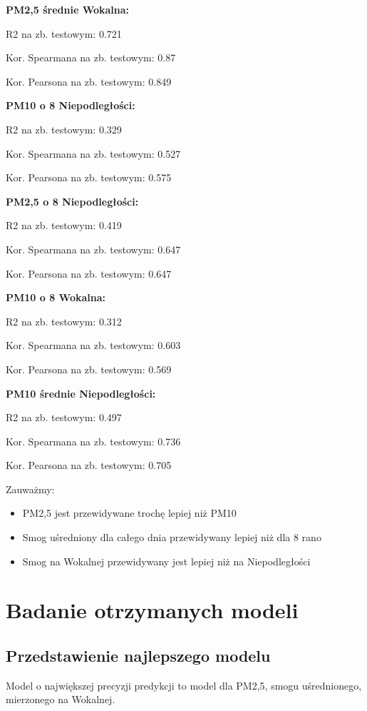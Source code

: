 \documentclass[a4paper,12pt,twoside,openany]{report}
\begin{document}
\textbf{PM2,5 średnie Wokalna:}

R2 na zb. testowym: 0.721

Kor. Spearmana na zb. testowym: 0.87

Kor. Pearsona na zb. testowym: 0.849


\textbf{PM10 o 8 Niepodległości:}

R2 na zb. testowym: 0.329

Kor. Spearmana na zb. testowym: 0.527

Kor. Pearsona na zb. testowym: 0.575


\textbf{PM2,5 o 8 Niepodległości:}

R2 na zb. testowym: 0.419

Kor. Spearmana na zb. testowym: 0.647

Kor. Pearsona na zb. testowym: 0.647


\textbf{PM10 o 8 Wokalna:}

R2 na zb. testowym: 0.312

Kor. Spearmana na zb. testowym: 0.603

Kor. Pearsona na zb. testowym: 0.569


\textbf{PM10 średnie Niepodległości:}

R2 na zb. testowym: 0.497

Kor. Spearmana na zb. testowym: 0.736

Kor. Pearsona na zb. testowym: 0.705


Zauważmy:

\begin{itemize}
	\item PM2,5 jest przewidywane trochę lepiej niż PM10
	\item Smog uśredniony dla całego dnia przewidywany lepiej niż dla 8 rano
	\item Smog na Wokalnej przewidywany jest lepiej niż na Niepodległości
\end{itemize}

\chapter{Badanie otrzymanych modeli}

\section{Przedstawienie najlepszego modelu}

Model o największej precyzji predykcji to model dla PM2,5, smogu uśrednionego, mierzonego na Wokalnej.
\end{document}
